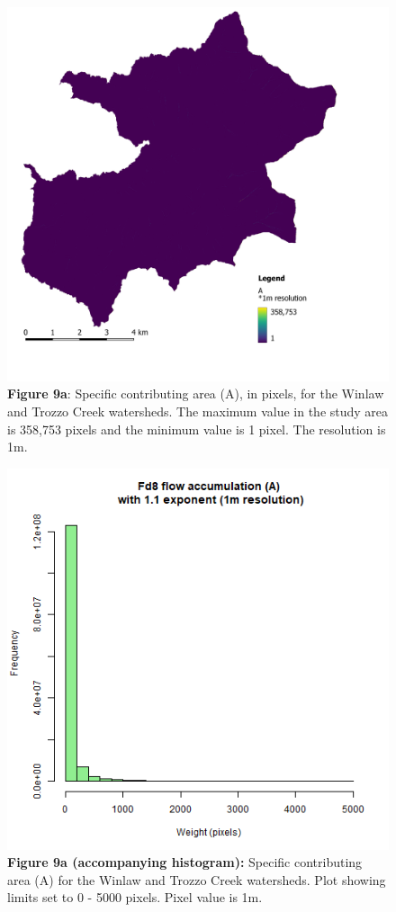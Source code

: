 \documentclass[
]{article}
\begin{document}
\begin{figure}
\centering
\includegraphics{img/a_1m_MAX.png}
\caption{\textbf{Figure 9a}: Specific contributing area (A), in pixels, for the Winlaw and Trozzo Creek watersheds. The maximum value in the study area is 358,753 pixels and the minimum value is 1 pixel. The resolution is 1m.}
\end{figure}

\begin{figure}
\centering
\includegraphics{img/fd8_1m_hist.png}
\caption{\textbf{Figure 9a (accompanying histogram):} Specific contributing area (A) for the Winlaw and Trozzo Creek watersheds. Plot showing limits set to 0 - 5000 pixels. Pixel value is 1m.}
\end{figure}
\end{document}
